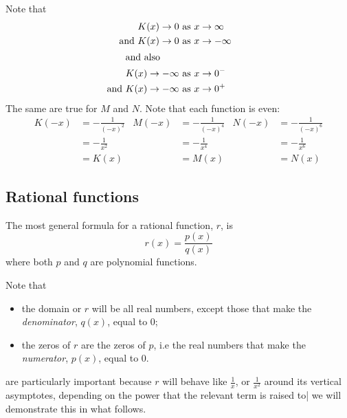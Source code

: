 \begin{doyouunderstand}
\begin{problem}
\begin{subproblem}
\begin{shortsolution}
			Note that
			\begin{align*}
				K(x)\rightarrow 0                                & \text{ as } x\rightarrow\infty  \\  
				\mathllap{\text{and }}    K(x)\rightarrow 0      & \text{ as } x\rightarrow-\infty \\ 
				\intertext{and also}
				K(x)\rightarrow -\infty                          & \text{ as } x\rightarrow 0^-    \\    
				\mathllap{\text{and }}   K(x)\rightarrow -\infty & \text{ as } x\rightarrow 0^+    
			\end{align*}
			The same are true for $M$ and $N$. Note that each function is even:
			\begin{align*}
				K(-x) & =-\frac{1}{(-x)^2} & M(-x) & =-\frac{1}{(-x)^4} & N(-x) & =-\frac{1}{(-x)^6} \\ 
				      & =-\frac{1}{x^2}    &       & =-\frac{1}{x^4}    &       & =-\frac{1}{x^6}    \\   
				      & =K(x)              &       & =M(x)              &       & =N(x)              
			\end{align*}
		\end{shortsolution}
	\end{subproblem}
	\end{problem}
\end{doyouunderstand}

\subsection*{Rational functions}
\begin{pccdefinition}\label{rat:def:function}
	The most general formula for a rational function, $r$, is
	\[
		r(x) = \frac{p(x)}{q(x)}
	\]
	where both $p$ and $q$ are polynomial functions. 
	
	Note that
	\begin{itemize}
		\item the domain or $r$ will be all real numbers, except those that
		make the \emph{denominator}, $q(x)$, equal to $0$;
		\item the zeros of $r$ are the zeros of $p$, i.e the real numbers
		that make the \emph{numerator}, $p(x)$, equal to $0$.
	\end{itemize}
	
	 are particularly important because $r$ 
	will behave like $\frac{1}{x}$, or $\frac{1}{x^2}$ around its vertical asymptotes, 
	depending on the power that the relevant term is raised to| we will demonstrate 
	this in what follows.
\end{pccdefinition}

